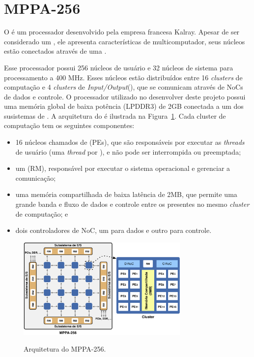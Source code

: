 \section{MPPA-256}
\label{sec:mppa}

O \mppa é um processador \manycore desenvolvido pela empresa francesa Kalray. Apesar de ser considerado um \manycore, ele apresenta características de multicomputador, seus núcleos estão conectados através de uma \noc.

Esse processador possui 256 núcleos de usuário e 32 núcleos de sistema para processamento a 400 MHz. Esses núcleos estão distribuídos entre 16 \textit{clusters} de computação e 4 \textit{clusters} de \textit{Input/Output}(\io), que se comunicam através de NoCs de dados e controle. O processador utilizado no desenvolver deste projeto possui uma memória global de baixa potência (LPDDR3) de 2GB conectada a um dos susistemas de \io. A arquitetura do \mppa é ilustrada na Figura~\ref{fig:mppaOverall}. Cada cluster de computação tem os seguintes componentes:

\begin{itemize}
    \item 16 núcleos chamados de \pes (PEs), que são responsáveis por executar as \textit{threads} de usuário (uma \textit{thread} por \pe), e não pode ser interrompida ou preemptada;
    
    \item um \rman (RM), responsável por executar o sistema operacional e gerenciar a comunicação;
    
    \item uma memória compartilhada de baixa latência de 2MB, que permite uma grande banda e fluxo de dados e controle entre os \pes presentes no mesmo \textit{cluster} de computação; e
    
    \item dois controladores de NoC, um para dados e outro para controle.
    
\end{itemize}

\begin{figure}
    \centering
    \caption{Arquitetura do MPPA-256.}
    \includegraphics[width=0.75\textwidth]{figs/mppa-overview.pdf} \\
    \label{fig:mppaOverall}
\end{figure}

